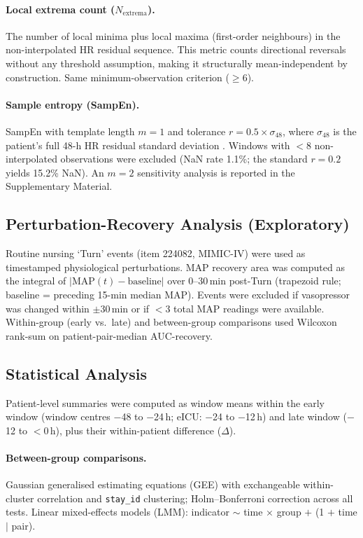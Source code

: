 \documentclass[12pt,a4paper]{article}
\begin{document}
\paragraph{Local extrema count ($N_{\text{extrema}}$).}
The number of local minima plus local maxima (first-order neighbours) in
the non-interpolated HR residual sequence.
This metric counts directional reversals without any threshold assumption,
making it structurally mean-independent by construction.
Same minimum-observation criterion ($\geq$6).

\paragraph{Sample entropy (SampEn).}
SampEn with template length $m=1$ and tolerance $r = 0.5 \times \sigma_{48}$,
where $\sigma_{48}$ is the patient's full 48-h HR residual standard deviation
\citep{richman2000}.
Windows with $<$8 non-interpolated observations were excluded
(NaN rate 1.1\%; the standard $r=0.2$ yields 15.2\% NaN).
An $m=2$ sensitivity analysis is reported in the Supplementary Material.

\subsection{Perturbation-Recovery Analysis (Exploratory)}
\label{sec:perturbation}

Routine nursing `Turn' events (item 224082, MIMIC-IV) were used as
timestamped physiological perturbations.
MAP recovery area was computed as the integral of
$|\text{MAP}(t) - \text{baseline}|$ over 0--30\,min post-Turn
(trapezoid rule; baseline = preceding 15-min median MAP).
Events were excluded if vasopressor was changed within $\pm$30\,min
or if $<$3 total MAP readings were available.
Within-group (early vs.\ late) and between-group comparisons used Wilcoxon
rank-sum on patient-pair-median AUC-recovery.

\subsection{Statistical Analysis}
\label{sec:stats}

Patient-level summaries were computed as window means within the
early window (window centres $-$48 to $-$24\,h; eICU: $-$24 to $-$12\,h)
and late window ($-$12 to $<$0\,h), plus their within-patient difference
($\Delta$).

\paragraph{Between-group comparisons.}
Gaussian generalised estimating equations (GEE) \citep{liang1986} with
exchangeable within-cluster correlation and \texttt{stay\_id} clustering;
Holm--Bonferroni correction across all tests.
Linear mixed-effects models (LMM):
indicator $\sim$ time $\times$ group $+$ (1 $+$ time $|$ pair).
\end{document}
